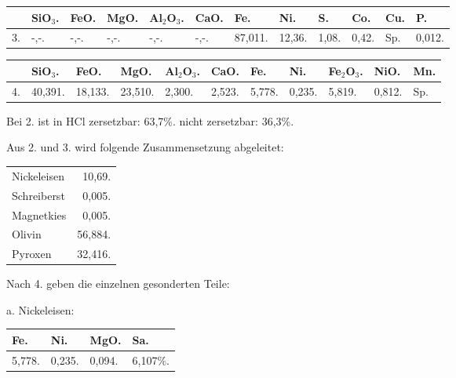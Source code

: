 \documentclass[a4paper, 11pt, oneside]{article}
\begin{document}
\begin{table}[H]
    \centering
    \footnotesize
    \begin{tabular}{p{3mm} p{4mm} p{5mm} p{5mm} p{5mm} p{5mm} p{6mm} p{6mm} p{6mm} p{6mm} p{6mm} p{6mm}}
         & SiO$_{3}$. & FeO. & MgO. & Al$_{2}$O$_{3}$. & CaO. & Fe. & Ni. & S. & Co. & Cu. & P. \\ \hline
        3. & -,-. & -,-. & -,-. & -,-. & -,-. & 87,011. & 12,36. & 1,08. & 0,42. & Sp. & 0,012. \\
    \end{tabular}
\end{table}

\begin{table}[H]
    \centering
    \footnotesize
    \begin{tabular}{p{3mm} p{6mm} p{6mm} p{6mm} p{6mm} p{5mm} p{5mm} p{5mm} p{6mm} p{6mm} p{5mm}}
         & SiO$_{3}$. & FeO. & MgO. & Al$_{2}$O$_{3}$. & CaO. & Fe. & Ni. & Fe$_{2}$O$_{3}$. & NiO. & Mn. \\ \hline
        4. & 40,391. & 18,133. & 23,510. & 2,300. & 2,523. & 5,778. & 0,235. & 5,819. & 0,812. & Sp. \\
    \end{tabular}
\end{table}

Bei 2. ist in HCl zersetzbar: 63,7\%. nicht zersetzbar: 36,3\%.

Aus 2. und 3. wird folgende Zusammensetzung abgeleitet:
\begin{table}[H]
    \centering
    \begin{tabular}{l r}
        Nickeleisen & 10,69. \\
        Schreiberst & 0,005. \\
        Magnetkies & 0,005. \\
        Olivin & 56,884. \\
        Pyroxen & 32,416. \\
    \end{tabular}
\end{table}

Nach 4. geben die einzelnen gesonderten Teile:

\begin{center}
a. Nickeleisen:
\end{center}

\begin{table}[H]
    \centering
    \begin{tabular}{l l l l}
        Fe. & Ni. & MgO. & Sa. \\ \hline
        5,778. & 0,235. & 0,094. & 6,107\%. \\
    \end{tabular}
\end{table}
\end{document}
